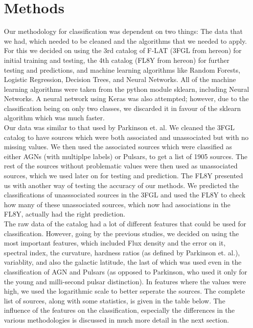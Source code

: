 \section{Methods}

Our methodology for classification was dependent on two things: The data that we had, which needed to be cleaned and the algorithms that we needed to apply. For this we decided on using the 3rd catalog of F-LAT (3FGL from hereon) for initial training and testing, the 4th catalog (FL8Y from hereon) for further testing and predictions, and machine learning algorithms like Random Forests, Logistic Regression, Decision Trees, and Neural Networks. All of the machine learning algorithms were taken from the python module sklearn, including Neural Networks. A neural network using Keras was also attempted; however, due to the classification being on only two classes, we discarded it in favour of the sklearn algorithm which was much faster.\\

Our data was similar to that used by Parkinson et. al. We cleaned the 3FGL catalog to have sources which were both associated and unassociated but with no missing values. We then used the associated sources which were classified as either AGNs (with multiplpe labels) or Pulsars, to get a list of 1905 sources. The rest of the sources without problematic values were then used as unassociated sources, which we used later on for testing and prediction. The FL8Y presented us with another way of testing the accuracy of our methods. We predicted the classifications of unasssociated sources in the 3FGL and used the FL8Y to check how many of these unassociated sources, which now had associations in the FL8Y, actually had the right prediction.\\

The raw data of the catalog had a lot of different features that could be used for classification. However, going by the previous studies, we decided on using the most important features, which included Flux density and the error on it, spectral index, the curvature, hardness ratios (as defined by Parkinson et. al.), variablity, and also the galactic latitude, the last of which was used even in the classification of AGN and Pulsars (as opposed to Parkinson, who used it only for the young and milli-second pulsar distinction). In features where the values were high, we used the logarithmic scale to better seperate the sources. The complete list of sources, along with some statistics, is given in the table below. The influence of the features on the classification, especially the differences in the various methodologies is discussed in much more detail in the next section.\\

